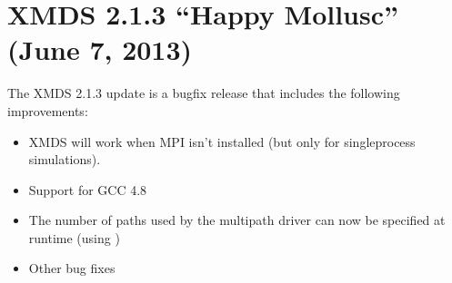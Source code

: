 \documentclass[letterpaper,10pt,english]{sphinxmanual}
\begin{document}
\section{XMDS 2.1.3 “Happy Mollusc” (June 7, 2013)}
\label{\detokenize{news:xmds-2-1-3-happy-mollusc-june-7-2013}}
\sphinxAtStartPar
The XMDS 2.1.3 update is a bugfix release that includes the following improvements:
\begin{itemize}
\item {} 
\sphinxAtStartPar
XMDS will work when MPI isn’t installed (but only for single\sphinxhyphen{}process simulations).

\item {} 
\sphinxAtStartPar
Support for GCC 4.8

\item {} 
\sphinxAtStartPar
The number of paths used by the multi\sphinxhyphen{}path driver can now be specified at run\sphinxhyphen{}time (using )

\item {} 
\sphinxAtStartPar
Other bug fixes

\end{itemize}
\end{document}
